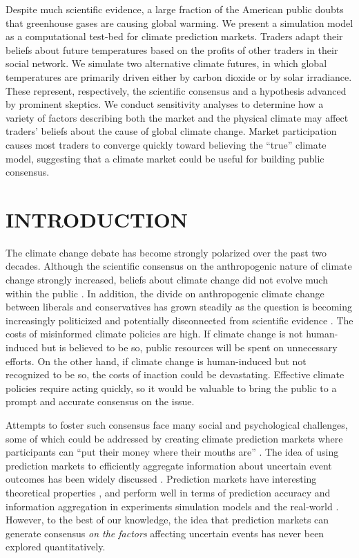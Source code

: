 \documentclass{wscpaperproc}\usepackage[]{graphicx}\usepackage[]{color}
\begin{document}
Despite much scientific evidence, a large fraction of the American public doubts that greenhouse gases are causing global warming. We present a simulation model as a computational test-bed for climate prediction markets. Traders adapt their beliefs about future temperatures based on the profits of other traders in their social network. We simulate two alternative climate futures, in which global temperatures are primarily driven either by carbon dioxide or by solar irradiance. These represent, respectively, the scientific consensus and a hypothesis advanced by prominent skeptics. We conduct sensitivity analyses to determine how a variety of factors describing both the market and the physical climate may affect traders' beliefs about the cause of global climate change. Market participation causes most traders to converge quickly toward believing the ``true'' climate model, suggesting that a climate market could be useful for building public consensus.

\section{INTRODUCTION}

The climate change debate has become strongly polarized over the past two decades. Although the scientific consensus on the anthropogenic nature of climate change strongly increased, beliefs about climate change did not evolve much within the public . In addition, the divide on anthropogenic climate change between liberals and conservatives has grown steadily as the question is becoming increasingly politicized and potentially disconnected from scientific evidence . The costs of misinformed climate policies are high. If climate change is not human-induced but is believed to be so, public resources will be spent on unnecessary efforts. On the other hand, if climate change is human-induced but not recognized to be so, the costs of inaction could be devastating. Effective climate policies require acting quickly, so it would be valuable to bring the public to a prompt and accurate consensus on the issue.

Attempts to foster such consensus face many social and psychological challenges, some of which could be addressed by creating climate prediction markets where participants can ``put their money where their mouths are'' . The idea of using prediction markets to efficiently aggregate information about uncertain event outcomes has been widely discussed . Prediction markets have interesting theoretical properties , and perform well in terms of prediction accuracy and information aggregation in experiments  simulation models  and the real-world . However, to the best of our knowledge, the idea that prediction markets can generate consensus \emph{on the factors\/} affecting uncertain events has never been explored quantitatively.
\end{document}
